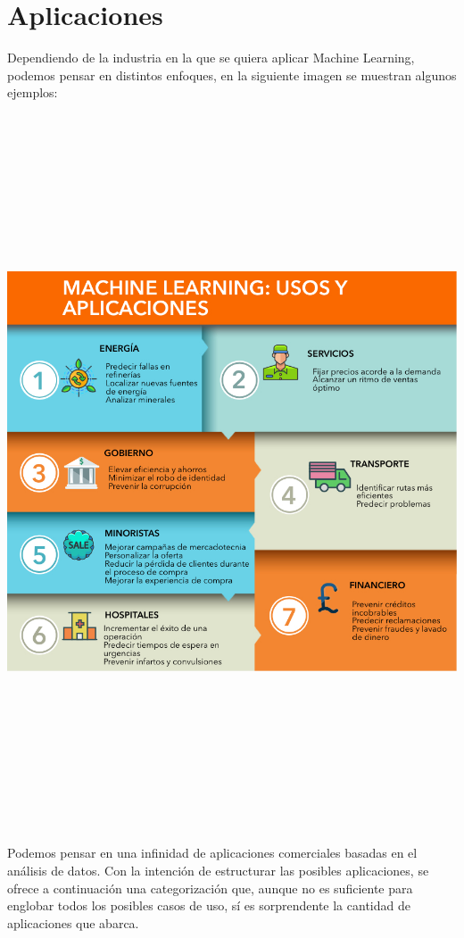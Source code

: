 \documentclass[
]{book}
\begin{document}
\hypertarget{aplicaciones}{%
\section{Aplicaciones}\label{aplicaciones}}

Dependiendo de la industria en la que se quiera aplicar Machine Learning, podemos pensar en distintos enfoques, en la siguiente imagen se muestran algunos ejemplos:

\begin{center}\includegraphics[width=600pt,height=600pt]{img/01-intro2ds/14_aplicaciones} \end{center}

Podemos pensar en una infinidad de aplicaciones comerciales basadas en el análisis de datos. Con la intención de estructurar las posibles aplicaciones, se ofrece a continuación una categorización que, aunque no es suficiente para englobar todos los posibles casos de uso, sí es sorprendente la cantidad de aplicaciones que abarca.
\end{document}
